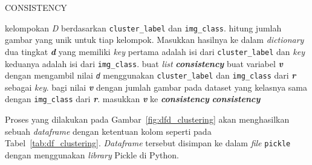 \begin{algorithm}[H]
	\caption{CONSISTENCY}
	\label{alg:consistency}
	\begin{algorithmic}[1]
		\STATE kelompokan \textit{D} berdasarkan \texttt{cluster\_label} dan \texttt{img\_class}.
		\STATE hitung jumlah gambar yang unik untuk tiap kelompok. Masukkan hasilnya ke dalam \textit{dictionary} dua tingkat \textit{\textbf{d}} yang memiliki \textit{key} pertama adalah isi dari \texttt{cluster\_label} dan \textit{key} keduanya adalah isi dari \texttt{img\_class}.
		\STATE buat \textit{list} \textit{\textbf{consistency}}
		\STATE buat variabel \textit{\textbf{v}} dengan mengambil nilai \textit{\texttt{d}} menggunakan \texttt{cluster\_label} dan \texttt{img\_class} dari \textit{\textbf{r}} sebagai \textit{key}.
		\STATE bagi nilai \textit{\textbf{v}} dengan jumlah gambar pada dataset yang kelasnya sama dengan \texttt{img\_class} dari \textit{\textbf{r}}.
		\STATE masukkan \textit{\textbf{v}} ke \textit{\textbf{consistency}}
		\ENDFOR
		\RETURN \textit{\textbf{consistency}}
	\end{algorithmic}
\end{algorithm}
Proses yang dilakukan pada Gambar~\ref{fig:dfd_clustering} akan menghasilkan sebuah \textit{dataframe} dengan ketentuan kolom seperti pada Tabel~\ref{tab:df_clustering}. \textit{Dataframe} tersebut disimpan ke dalam \textit{file} \texttt{pickle} dengan menggunakan \textit{library} Pickle di Python.
